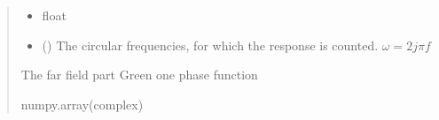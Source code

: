 \documentclass[letterpaper,10pt,english]{sphinxmanual}
\begin{document}
\begin{fulllineitems}
\begin{quote}
\begin{description}
\begin{itemize}
\item {} 
\sphinxAtStartPar
{} \textendash{} float

\item {} 
\sphinxAtStartPar
{} (\sphinxstyleliteralemphasis{\sphinxupquote{(}}\sphinxstyleliteralemphasis{\sphinxupquote{)}}) \textendash{} The circular frequencies, for which the response is counted. \(\omega = 2j\pi f\)

\end{itemize}

\sphinxAtStartPar
The far field part Green one phase function

\sphinxAtStartPar
numpy.array(complex)

\end{description}\end{quote}

\end{fulllineitems}

\end{document}
